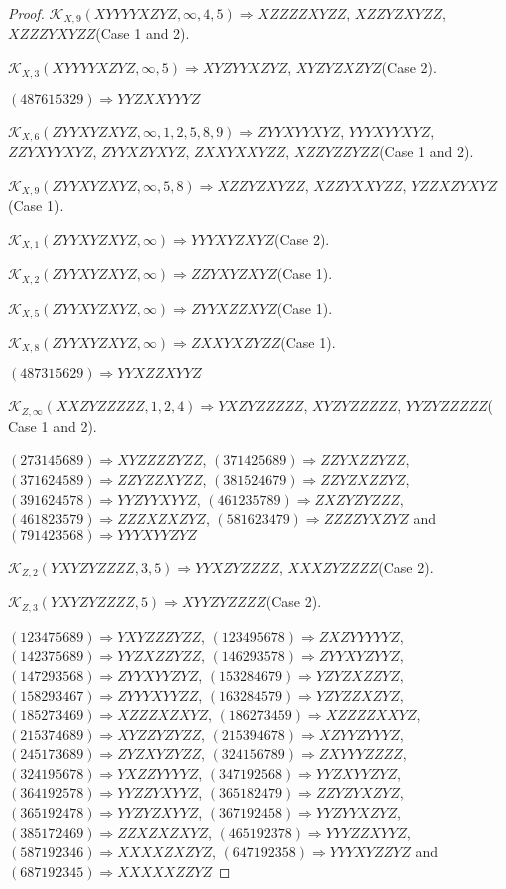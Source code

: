 \documentclass[12pt]{article}
\theoremstyle{plain}
\theoremstyle{definition}
\theoremstyle{remark}
\newcommand{\fancy}[1]{\mathcal{#1}}
\def\K{\fancy{K}}
\begin{document}
\begin{proof}
	$\K_{X,9}(XYYYYXZYZ,\infty,4, 5)\Rightarrow $$XZZZZXYZZ$, $XZZYZXYZZ$, $XZZZYXYZZ$(Case 1 and 2).
	
	$\K_{X,3}(XYYYYXZYZ,\infty,5)\Rightarrow $$XYZYYXZYZ$, $XYZYZXZYZ$(Case 2).
	
	
	
	$(4 8 7 6 1 5 3 2 9)\Rightarrow YYZXXYYYZ$
	
	
	$\K_{X,6}(ZYYXYZXYZ,\infty,1, 2, 5, 8, 9)\Rightarrow $$ZYYXYYXYZ$, $YYYXYYXYZ$, $ZZYXYYXYZ$, $ZYYXZYXYZ$, $ZXXYXXYZZ$, $XZZYZZYZZ$(Case 1 and 2).
	
	$\K_{X,9}(ZYYXYZXYZ,\infty,5, 8)\Rightarrow $$XZZYZXYZZ$, $XZZYXXYZZ$, $YZZXZYXYZ$(Case 1).
	
	$\K_{X,1}(ZYYXYZXYZ,\infty)\Rightarrow $$YYYXYZXYZ$(Case 2).
	
	$\K_{X,2}(ZYYXYZXYZ,\infty)\Rightarrow $$ZZYXYZXYZ$(Case 1).
	
	$\K_{X,5}(ZYYXYZXYZ,\infty)\Rightarrow $$ZYYXZZXYZ$(Case 1).
	
	$\K_{X,8}(ZYYXYZXYZ,\infty)\Rightarrow $$ZXXYXZYZZ$(Case 1).
	
	
	
	$(4 8 7 3 1 5 6 2 9)\Rightarrow YYXZZXYYZ$
	
	
	$\K_{Z,\infty}(XXZYZZZZZ,1, 2, 4)\Rightarrow $$YXZYZZZZZ$, $XYZYZZZZZ$, $YYZYZZZZZ$( Case 1 and 2).
	
	
	
	$(2 7 3 1 4 5 6 8 9)\Rightarrow XYZZZZYZZ$, $(3 7 1 4 2 5 6 8 9)\Rightarrow ZZYXZZYZZ$, $(3 7 1 6 2 4 5 8 9)\Rightarrow ZZYZZXYZZ$, $(3 8 1 5 2 4 6 7 9)\Rightarrow ZZYZXZZYZ$, $(3 9 1 6 2 4 5 7 8)\Rightarrow YYZYYXYYZ$, $(4 6 1 2 3 5 7 8 9)\Rightarrow ZXZYZYZZZ$, $(4 6 1 8 2 3 5 7 9)\Rightarrow ZZZXZXZYZ$, $(5 8 1 6 2 3 4 7 9)\Rightarrow ZZZZYXZYZ$ and $(7 9 1 4 2 3 5 6 8)\Rightarrow YYYXYYZYZ$
	
	
	$\K_{Z,2}(YXYZYZZZZ,3, 5)\Rightarrow $$YYXZYZZZZ$, $XXXZYZZZZ$(Case 2).
	
	$\K_{Z,3}(YXYZYZZZZ,5)\Rightarrow $$XYYZYZZZZ$(Case 2).
	
	
	
	$(1 2 3 4 7 5 6 8 9)\Rightarrow YXYZZZYZZ$, $(1 2 3 4 9 5 6 7 8)\Rightarrow ZXZYYYYYZ$, $(1 4 2 3 7 5 6 8 9)\Rightarrow YYZXZZYZZ$, $(1 4 6 2 9 3 5 7 8)\Rightarrow ZYYXYZYYZ$, $(1 4 7 2 9 3 5 6 8)\Rightarrow ZYYXYYZYZ$, $(1 5 3 2 8 4 6 7 9)\Rightarrow YZYZXZZYZ$, $(1 5 8 2 9 3 4 6 7)\Rightarrow ZYYYXYYZZ$, $(1 6 3 2 8 4 5 7 9)\Rightarrow YZYZZXZYZ$, $(1 8 5 2 7 3 4 6 9)\Rightarrow XZZZXZXYZ$, $(1 8 6 2 7 3 4 5 9)\Rightarrow XZZZZXXYZ$, $(2 1 5 3 7 4 6 8 9)\Rightarrow XYZZYZYZZ$, $(2 1 5 3 9 4 6 7 8)\Rightarrow XZYYZYYYZ$, $(2 4 5 1 7 3 6 8 9)\Rightarrow ZYZXYZYZZ$, $(3 2 4 1 5 6 7 8 9)\Rightarrow ZXYYYZZZZ$, $(3 2 4 1 9 5 6 7 8)\Rightarrow YXZZYYYYZ$, $(3 4 7 1 9 2 5 6 8)\Rightarrow YYZXYYZYZ$, $(3 6 4 1 9 2 5 7 8)\Rightarrow YYZZYXYYZ$, $(3 6 5 1 8 2 4 7 9)\Rightarrow ZZYZYXZYZ$, $(3 6 5 1 9 2 4 7 8)\Rightarrow YYZYZXYYZ$, $(3 6 7 1 9 2 4 5 8)\Rightarrow YYZYYXZYZ$, $(3 8 5 1 7 2 4 6 9)\Rightarrow ZZXZXZXYZ$, $(4 6 5 1 9 2 3 7 8)\Rightarrow YYYZZXYYZ$, $(5 8 7 1 9 2 3 4 6)\Rightarrow XXXXZXZYZ$, $(6 4 7 1 9 2 3 5 8)\Rightarrow YYYXYZZYZ$ and $(6 8 7 1 9 2 3 4 5)\Rightarrow XXXXXZZYZ$
	

\end{proof}
\end{document}
